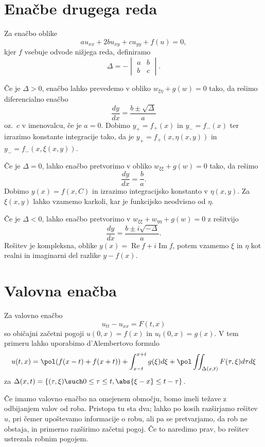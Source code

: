 \section{Enačbe drugega reda}

Za enačbo oblike
\[
  a u_{xx} + 2b u_{xy} + c u_{yy} + f(u) = 0,
\]
kjer $f$ vsebuje odvode nižjega reda, definiramo
\[
  \Delta = -
  \begin{vmatrix}
	a & b \\
	b & c
  \end{vmatrix}.
\]

Če je $\Delta > 0$, enačbo lahko prevedemo v obliko $w_{\xi \eta} + g(w) = 0$
tako, da rešimo diferencialno enačbo
\[
  \frac{dy}{dx} = \frac{b \pm \sqrt{\Delta}}{a}
\]
oz.~$c$ v imenovalcu, če je $a = 0$.
Dobimo $y_+ = f_+(x)$ in $y_- = f_-(x)$ ter izrazimo konstante integracije tako,
da je $y_+ = f_+(x, \eta(x,y))$ in $y_- = f_-(x, \xi(x,y))$.

Če je $\Delta = 0$, lahko enačbo pretvorimo v obliko $w_{\xi \xi} + g(w) = 0$
tako, da rešimo
\[
  \frac{dy}{dx} = \frac{b}{a}.
\]
Dobimo $y(x) = f(x,C)$ in izrazimo integracijsko konstanto v $\eta(x,y)$.
Za $\xi(x,y)$ lahko vzamemo karkoli, kar je funkcijsko neodvisno od $\eta$.

Če je $\Delta < 0$, lahko enačbo pretvorimo v $w_{\xi \xi} + w_{\eta \eta} +
g(w) = 0$ z rešitvijo
\[
  \frac{dy}{dx} = \frac{b \pm i \sqrt{- \Delta}}{a}.
\]
Rešitev je kompleksna, oblike $y(x) = \operatorname{Re} f + i \operatorname{Im}
f$, potem vzamemo $\xi$ in $\eta$ kot realni in imaginarni del razlike $y -
f(x)$.

\section{Valovna enačba}

Za valovno enačbo
\[
  u_{tt} - u_{xx} = F(t,x)
\]
so običajni začetni pogoji $u(0, x) = f(x)$ in $u_t(0, x) = g(x)$.
V tem primeru lahko uporabimo d'Alembertovo formulo
\[
  u(t,x) = \pol (f(x-t) + f(x + t))
  + \int_{x-t}^{x+t} g(\xi) d\xi
  + \pol \iint_{\Delta(x,t)} F(\tau, \xi) d\tau d\xi
\]
za $\Delta(x,t) = \{(\tau, \xi) \such 0 \le \tau \le t, \abs{\xi-x} \le t - \tau\}$.

Če imamo valovno enačbo na omejenem območju, bomo imeli težave z odbijanjem
valov od roba.
Pristopa tu sta dva; lahko po kosih razširjamo rešitev $u$, pri čemer upoštevamo
informacije o robu, ali pa se pretvarjamo, da rob ne obstaja, in primerno
razširimo začetni pogoj.
Če to naredimo prav, bo rešitev ustrezala robnim pogojem.

